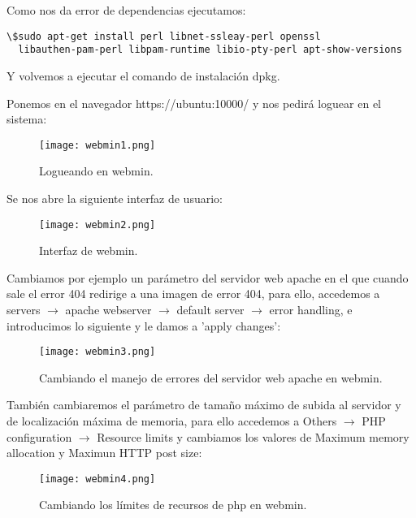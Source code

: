 \documentclass[a4paper, 11pt]{article} %
\begin{document}
Como nos da error de dependencias ejecutamos:
\begin{verbatim}
\$sudo apt-get install perl libnet-ssleay-perl openssl 
  libauthen-pam-perl libpam-runtime libio-pty-perl apt-show-versions
\end{verbatim}
Y volvemos a ejecutar el comando de instalación dpkg.

\pagebreak

Ponemos en el navegador https://ubuntu:10000/ y nos pedirá loguear en el sistema:
\begin{figure}[h]
\centering 
\texttt{[image: webmin1.png]} 
\caption{Logueando en webmin.} 
\vspace{-0.5cm}
\label{contexto:figura} 
\end{figure}

Se nos abre la siguiente interfaz de usuario:
\begin{figure}[h]
\centering 
\texttt{[image: webmin2.png]} 
\caption{Interfaz de webmin.} 
\vspace{-0.5cm}
\label{contexto:figura} 
\end{figure}

\pagebreak

Cambiamos por ejemplo un parámetro del servidor web apache en el que cuando sale el error 404 redirige a una imagen de error 404, para ello, accedemos a servers $\rightarrow$ apache webserver $\rightarrow$ default server $\rightarrow$ error handling, e introducimos lo siguiente y le damos a 'apply changes':

\begin{figure}[h]
\centering 
\texttt{[image: webmin3.png]} 
\caption{Cambiando el manejo de errores del servidor web apache en webmin.} 
\vspace{-0.5cm}
\label{contexto:figura} 
\end{figure}

También cambiaremos el parámetro de tamaño máximo de subida al servidor y de localización máxima de memoria, para ello accedemos a Others $\rightarrow$ PHP configuration $\rightarrow$ Resource limits y cambiamos los valores de Maximum memory allocation y Maximun HTTP post size:

\begin{figure}[h]
\centering 
\texttt{[image: webmin4.png]} 
\caption{Cambiando los límites de recursos de php en webmin.} 
\vspace{-0.5cm}
\label{contexto:figura} 
\end{figure}
\end{document}
